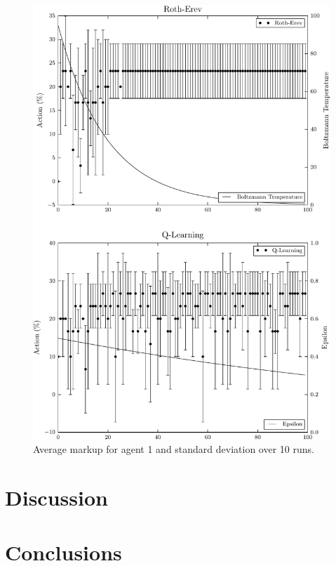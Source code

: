 \begin{figure}
  \centering
  \includegraphics{figures/fig5_1_g1_action}
  \caption{Average markup for agent 1 and standard deviation over 10 runs.}
  \label{fig:libpsat}
\end{figure}

\section{Discussion}
\section{Conclusions}


